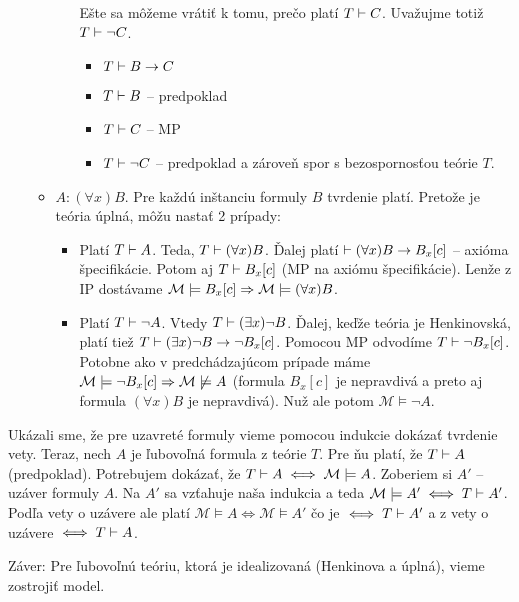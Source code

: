 \begin{dokaz}
\begin{itemize}
\begin{itemize}
\begin{itemize}
                Ešte sa môžeme vrátiť k tomu, prečo platí $T \vdash C$.
                Uvažujme totiž $T \vdash \neg C$.
                \begin{itemize}
                \item $T \vdash B \rightarrow C$
                \item $T \vdash B$ -- predpoklad
                \item $T \vdash C$ -- MP
                \item $T \vdash \neg C$ -- predpoklad a zároveň
                    spor s bezospornosťou teórie $T$.
                \end{itemize}
            \end{itemize}

        \item $A: (\forall x) B$. Pre každú
            inštanciu formuly $B$ tvrdenie platí.
            Pretože je teória úplná, môžu nastať 2 prípady:
            \begin{itemize}
            \item Platí $T\vdash A$.
                Teda, $T \vdash (\forall x) B$.
                Ďalej platí $\vdash (\forall x) B \rightarrow B_x[c]$
                -- axióma špecifikácie.
                Potom aj $T \vdash B_x[c]$ (MP na axiómu
                špecifikácie). Lenže z IP dostávame
                $\mathcal{M} \models B_x[c] \Rightarrow 
                 \mathcal{M} \models (\forall x) B$.
            \smallskip
            \item Platí $T \vdash \neg A$. Vtedy
                $T \vdash (\exists x) \neg B$. Ďalej, keďže teória je
                Henkinovská, platí tiež 
                $T \vdash (\exists x) \neg B \rightarrow \neg B_x[c]$.
                Pomocou MP odvodíme
                $T \vdash \neg B_x[c]$. Potobne ako v
                predchádzajúcom prípade máme
                $\mathcal{M} \models \neg B_x[c] \Rightarrow
                 \mathcal{M} \not \models A$ (formula $B_x[c]$ je
                 nepravdivá a preto aj formula $(\forall x) B$ je
                 nepravdivá). Nuž ale potom
                 $\mathcal{M} \models \neg A$.
            \end{itemize}

        \end{itemize}
    \end{itemize}

    Ukázali sme, že pre uzavreté formuly vieme pomocou indukcie
    dokázať tvrdenie vety. Teraz, nech $A$ je ľubovoľná formula z teórie $T$.
    Pre ňu platí, že $T \vdash A$ (predpoklad).
    Potrebujem dokázať, že $T \vdash A \iff \mathcal{M} \models A$.
    Zoberiem si $A'$ -- uzáver formuly $A$.
    Na $A'$ sa vzťahuje naša indukcia a teda 
    $\mathcal{M} \models A' \iff T \vdash A'$.
    Podľa vety o uzávere ale platí
    $\mathcal{M} \models A \iff  \mathcal{M} \models A'$ čo je 
    $\iff T \vdash A'$ a z vety o uzávere $\iff T \vdash A$.
    \\
\end{dokaz}

\noindent
Záver: Pre ľubovoľnú teóriu, ktorá je idealizovaná (Henkinova a
úplná), vieme zostrojiť model.

